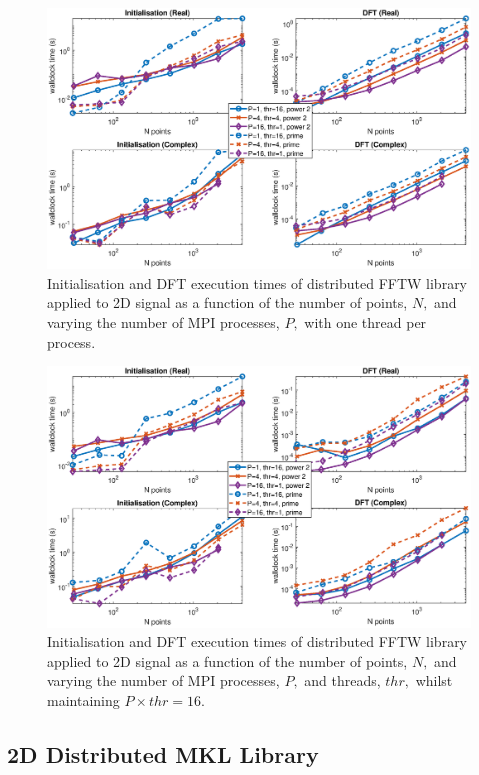 \documentclass[a4paper]{article}
\begin{document}
\begin{figure}[htb]
    \centering
    \includegraphics[width=\linewidth]{../results/fftw_2d_mpi.eps}
  \caption{Initialisation and DFT execution times of distributed FFTW library applied to 2D signal as a function of the
    number of points, $N,$ and varying the number of MPI processes, $P,$ with one thread per process.}
  \label{2DDistFFTW}
\end{figure}

\begin{figure}[htb]
    \centering
    \includegraphics[width=\linewidth]{../results/fftw_2d_mpi_thr.eps}
  \caption{Initialisation and DFT execution times of distributed FFTW library applied to 2D signal as a function of the
    number of points, $N,$ and varying the number of MPI processes, $P,$ and threads, $thr,$ whilst maintaining $P\times thr=16.$}
  \label{2DDistFFTW16}
\end{figure}



\subsection{2D Distributed MKL Library}\label{Sec:2DDistMKL}
\end{document}
